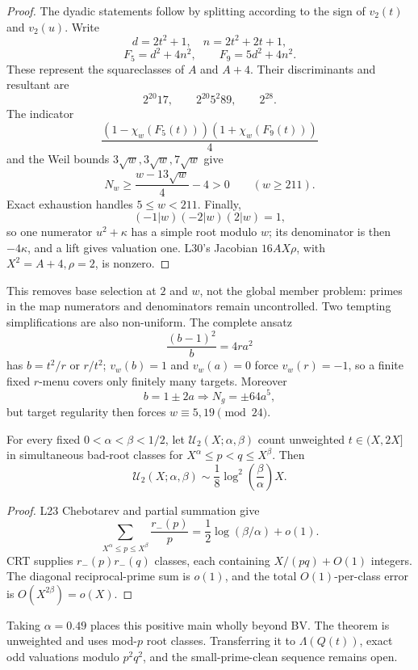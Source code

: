 \begin{proof}
The dyadic statements follow by splitting according to the sign of
\(v_2(t)\) and \(v_2(u)\).  Write
\[
d=2t^2+1,\quad n=2t^2+2t+1,
\]
\[
F_5=d^2+4n^2,\qquad F_9=5d^2+4n^2.
\]
These represent the squareclasses of \(A\) and \(A+4\).  Their
discriminants and resultant are
\[
2^{20}17,\qquad2^{20}5^2 89,\qquad2^{28}.
\]
The indicator
\[
\frac{(1-\chi_w(F_5(t)))(1+\chi_w(F_9(t)))}4
\]
and the Weil bounds \(3\sqrt w,3\sqrt w,7\sqrt w\) give
\[
N_w\ge\frac{w-13\sqrt w}{4}-4>0\qquad(w\ge211).
\]
Exact exhaustion handles \(5\le w<211\).  Finally,
\[
(-1|w)(-2|w)(2|w)=1,
\]
so one numerator \(u^2+\kappa\) has a simple root modulo \(w\); its
denominator is then \(-4\kappa\), and a lift gives valuation one.
L30's Jacobian \(16AX\rho\), with \(X^2=A+4,\rho=2\), is nonzero.
\end{proof}

This removes base selection at \(2\) and \(w\), not the global member
problem: primes in the map numerators and denominators remain
uncontrolled.  Two tempting simplifications are also non-uniform.
The complete ansatz
\[
\frac{(b-1)^2}{b}=4ra^2
\]
has \(b=t^2/r\) or \(r/t^2\); \(v_w(b)=1\) and \(v_w(a)=0\) force
\(v_w(r)=-1\), so a finite fixed \(r\)-menu covers only finitely many
targets.  Moreover
\[
b=1\pm2a\Longrightarrow N_g=\pm64a^5,
\]
but target regularity then forces \(w\equiv5,19\pmod{24}\).

\begin{theorem}
For every fixed \(0<\alpha<\beta<1/2\), let
\(\mathcal U_2(X;\alpha,\beta)\) count unweighted
\(t\in(X,2X]\) in simultaneous bad-root classes for
\(X^\alpha\le p<q\le X^\beta\).  Then
\[
\mathcal U_2(X;\alpha,\beta)
\sim\frac18\log^2\!\left(\frac\beta\alpha\right)X.
\]
\end{theorem}

\begin{proof}
L23 Chebotarev and partial summation give
\[
\sum_{X^\alpha\le p\le X^\beta}\frac{r_-(p)}p
=\frac12\log(\beta/\alpha)+o(1).
\]
CRT supplies \(r_-(p)r_-(q)\) classes, each containing
\(X/(pq)+O(1)\) integers.  The diagonal reciprocal-prime sum is
\(o(1)\), and the total \(O(1)\)-per-class error is
\(O(X^{2\beta})=o(X)\).
\end{proof}

Taking \(\alpha=0.49\) places this positive main wholly beyond BV.
The theorem is unweighted and uses mod-\(p\) root classes.  Transferring
it to \(\Lambda(Q(t))\), exact odd valuations modulo \(p^2q^2\), and
the small-prime-clean sequence remains open.

